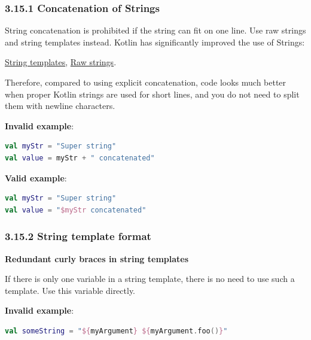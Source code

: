 \subsubsection*{\textbf{3.15.1 Concatenation of Strings}}
\leavevmode\newline

\label{sec:3.15.1}

String concatenation is prohibited if the string can fit on one line. Use raw strings and string templates instead. Kotlin has significantly improved the use of Strings: 

\href{https://kotlinlang.org/docs/reference/basic-types.html#string-templates}{String templates}, \href{https://kotlinlang.org/docs/reference/basic-types.html#string-literals}{Raw strings}.

Therefore, compared to using explicit concatenation, code looks much better when proper Kotlin strings are used for short lines, and you do not need to split them with newline characters.



\textbf{Invalid example}:

\begin{lstlisting}[language=Kotlin]
val myStr = "Super string"
val value = myStr + " concatenated"
\end{lstlisting}


\textbf{Valid example}:

\begin{lstlisting}[language=Kotlin]
val myStr = "Super string"
val value = "$myStr concatenated"
\end{lstlisting}


\subsubsection*{\textbf{3.15.2 String template format}}
\leavevmode\newline

\label{sec:3.15.2}

\textbf{Redundant curly braces in string templates}



If there is only one variable in a string template, there is no need to use such a template. Use this variable directly.

\textbf{Invalid example}:

\begin{lstlisting}[language=Kotlin]
val someString = "${myArgument} ${myArgument.foo()}"
\end{lstlisting}


